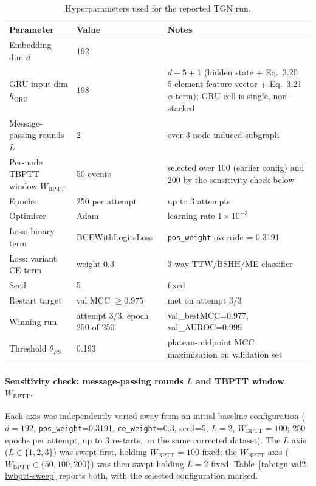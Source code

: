 \begin{table}[htbp]
\centering
\caption{Hyperparameters used for the reported TGN run.}
\label{tab:tgn-val2-hparams}
\begin{tabular}{@{}llp{7cm}@{}}
\toprule
Parameter & Value & Notes \\
\midrule
Embedding dim $d$ & 192 & \\
GRU input dim $h_{\text{GRU}}$ & 198 & $d + 5 + 1$ (hidden state + Eq.~3.20 5-element feature vector + Eq.~3.21 $\phi$ term); GRU cell is single, non-stacked \\
Message-passing rounds $L$ & 2 & over 3-node induced subgraph \\
Per-node TBPTT window $W_{\text{BPTT}}$ & 50 events & selected over 100 (earlier config) and 200 by the sensitivity check below \\
Epochs & 250 per attempt & up to 3 attempts \\
Optimiser & Adam & learning rate $1\times10^{-3}$ \\
Loss: binary term & BCEWithLogitsLoss & \texttt{pos\_weight} override = 0.3191 \\
Loss: variant CE term & weight 0.3 & 3-way TTW/BSHH/ME classifier \\
Seed & 5 & fixed \\
Restart target & val MCC $\geq 0.975$ & met on attempt 3/3 \\
Winning run & attempt 3/3, epoch 250 of 250 & val\_bestMCC=0.977, val\_AUROC=0.999 \\
Threshold $\theta_{FS}$ & 0.193 & plateau-midpoint MCC maximisation on validation set \\
\bottomrule
\end{tabular}
\end{table}

\paragraph{Sensitivity check: message-passing rounds $L$ and TBPTT window
$W_{\text{BPTT}}$.} Each axis was independently varied away from an
initial baseline configuration ($d=192$, \texttt{pos\_weight}=0.3191,
\texttt{ce\_weight}=0.3, seed=5, $L=2$, $W_{\text{BPTT}}=100$; 250 epochs
per attempt, up to 3 restarts, on the same corrected dataset). The $L$
axis ($L\in\{1,2,3\}$) was swept first, holding $W_{\text{BPTT}}=100$
fixed; the $W_{\text{BPTT}}$ axis ($W_{\text{BPTT}}\in\{50,100,200\}$) was
then swept holding $L=2$ fixed. Table~\ref{tab:tgn-val2-lwbptt-sweep}
reports both, with the selected configuration marked.

